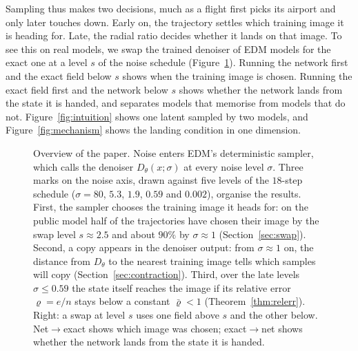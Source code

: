 \documentclass{article} %
\theoremstyle{plain}
\theoremstyle{definition}
\theoremstyle{remark}
\begin{document}
Sampling thus makes two decisions, much as a flight first picks its airport and only later
touches down. Early on, the trajectory settles which training image it is heading for. Late, the
radial ratio decides whether it lands on that image. To see this on real models, we swap the
trained denoiser of EDM models for the exact one at a level $s$ of the noise schedule
(Figure~\ref{fig:overview}). Running the network first and the exact field below $s$ shows when the
training image is chosen. Running the exact field first and the network below $s$ shows whether
the network lands from the state it is handed, and separates models that memorise from models
that do not. Figure~\ref{fig:intuition} shows one latent sampled by two models, and
Figure~\ref{fig:mechanism} shows the landing condition in one dimension.

\begin{figure}[t]
\centering
{}
\caption{Overview of the paper. Noise enters EDM's deterministic sampler, which calls the
denoiser $D_\theta(x;\sigma)$ at every noise level $\sigma$. Three marks on the noise axis, drawn
against five levels of the $18$-step schedule ($\sigma=80$, $5.3$, $1.9$, $0.59$ and $0.002$),
organise the results. First, the sampler chooses the training image it heads for: on the public
model half of the trajectories have chosen their image by the swap level $s\approx2.5$ and about
$90\%$ by $\sigma\approx1$ (Section~\ref{sec:swap}). Second, a copy appears in the denoiser output:
from $\sigma\approx1$ on, the distance from $D_\theta$ to the nearest training image tells which
samples will copy (Section~\ref{sec:contraction}). Third, over the late levels $\sigma\le0.59$ the
state itself reaches the image if its relative error $\varrho=e/n$ stays below a constant
$\bar\varrho<1$ (Theorem~\ref{thm:relerr}). Right: a swap at level $s$ uses one field above $s$ and
the other below. Net$\to$exact shows which image was chosen; exact$\to$net shows whether the
network lands from the state it is handed.}
\label{fig:overview}
\end{figure}
\end{document}
